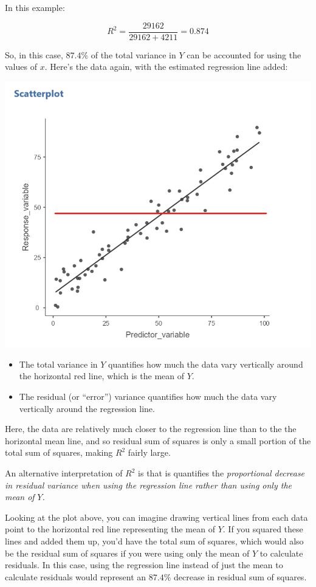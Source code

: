 \documentclass[
  letterpaper,
  DIV=11,
  numbers=noendperiod]{scrreprt}
\begin{document}
In this example:

\[
R^2=\frac{29162}{29162+4211}=0.874
\]

So, in this case, \(87.4\%\) of the total variance in \(Y\) can be
accounted for using the values of \(x\). Here's the data again, with the
estimated regression line added:

\includegraphics{images/mod2_pt1 (29).png}

\begin{itemize}
\item
  The total variance in \(Y\) quantifies how much the data vary
  vertically around the horizontal red line, which is the mean of \(Y\).
\item
  The residual (or ``error'') variance quantifies how much the data vary
  vertically around the regression line.
\end{itemize}

Here, the data are relatively much closer to the regression line than to
the the horizontal mean line, and so residual sum of squares is only a
small portion of the total sum of squares, making \(R^2\) fairly large.

An alternative interpretation of \(R^2\) is that is quantifies the
\emph{proportional decrease in residual variance when using the
regression line rather than using only the mean of} \(Y\)\emph{.}

Looking at the plot above, you can imagine drawing vertical lines from
each data point to the horizontal red line representing the mean of
\(Y\). If you squared these lines and added them up, you'd have the
total sum of squares, which would also be the residual sum of squares if
you were using only the mean of \(Y\) to calculate residuals. In this
case, using the regression line instead of just the mean to calculate
residuals would represent an \(87.4\%\) decrease in residual sum of
squares.
\end{document}
